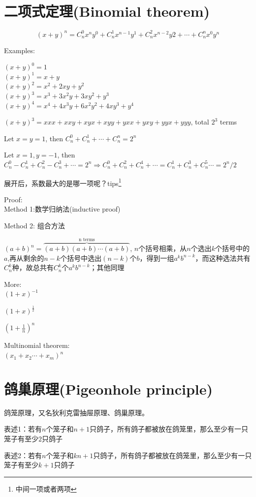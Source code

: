 \documentclass[../main.tex]{subfiles}
\begin{document}
\section{二项式定理(Binomial theorem)}
\[
  (x+y)^{n}=C_{n}^{0}x^{n}y^{0}+C_{n}^1x^{n-1}y^1+C_{n}^2x^{n-2}y2+\cdots +C_{n}^{n}x^{0}y^{n}
\]

Examples:

$(x+y)^{0}=1$\\
$(x+y)^1=x+y$\\
$(x+y)^2=x^2+2xy+y^2$\\
$(x+y)^3=x^3+3x^2y+3xy^2+y^3$\\
$(x+y)^4=x^4+4x^3y+6x^2y^2+4xy^3+y^4$

$(x+y)^3=xxx+xxy+xyx+xyy+yxx+yxy+yyx+yyy$, total $2^3$ terms

Let $x=y=1$, then $C_{n}^{0}+C_{n}^1+\cdots +C_{n}^{n}=2^n$

Let $x=1, y=-1$, then $C_n^0-C_n^1+C_n^2-C_n^3+\cdots=2^n \Rightarrow C_n^0+C_n^2+C_n^4+\cdots = C_n^1+C_n^3+C_n^5\cdots = 2^n/2$

展开后，系数最大的是哪一项呢？tips\footnote{中间一项或者两项}

Proof:\\
Method 1:数学归纳法(inductive proof)

Method 2: 组合方法

$(a+b)^{n}=\overbrace{(a+b)(a+b)\cdots (a+b)}^{\text{n terms}}$, $n$个括号相乘，从$n$个选出$k$个括号中的$a$,再从剩余的$n-k$个括号中选出$(n-k)$个$b$，得到一组$a^{k}b^{n-k}$，而这种选法共有$C_{n}^{k}$种，故总共有$C_{n}^{k}$个$a^{k}b^{n-k}$；其他同理

More:\\
$(1+x)^{-1}$

$(1+x)^{\frac{1}{2}}$

$(1+\frac{1}{n})^{n}$

Multinomial theorem:\\
$(x_1+x_2\cdots +x_{m})^{n}$

\section{鸽巢原理(Pigeonhole principle)}

鸽笼原理，又名狄利克雷抽屉原理、鸽巢原理。

表述1：若有$n$个笼子和$n+1$只鸽子，所有鸽子都被放在鸽笼里，那么至少有一只笼子有至少$2$只鸽子

表述2：若有$n$个笼子和$kn+1$只鸽子，所有鸽子都被放在鸽笼里，那么至少有一只笼子有至少$k+1$只鸽子
\end{document}
